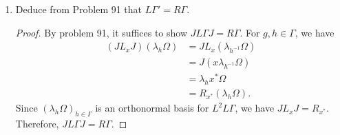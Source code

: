 \documentclass[a4paper,10pt]{report}
\DeclarePairedDelimiter{\set}{\{}{\}}
\begin{document}
\begin{enumerate}
\begin{enumerate}
\begin{proof}
					Now for all $g, h \in \Gamma$,
					\begin{align*}
						L_{\lambda_g}u\delta_h
						& = L_{\lambda_g}\lambda_h\Omega \\
						& = \lambda_g\lambda_h\Omega \\
						& = \lambda_{gh}\Omega \\
						& = u\delta_{gh} \\
						& = u\lambda_g\delta_h.
					\end{align*}
					Hence by linearity and continuity of $u$ and each $\lambda_g$, we have
					$L_xu\xi = ux\xi$ for all $\xi \in \ell^2\Gamma$ and all
					$x \in \text{span}\set{\lambda_g : g \in \Gamma}$.
					It remains to check that if $x_i \to x$ SOT, then $L_{x_i} \to L_x$ SOT.
					By the Kaplansky density theorem, we may assume $\|x_i\| \le \|x\|$ for all $i$.
					Then for $y \in L\Gamma$, we have $\|x_iy\| \le \|xy\|$ and $x_iy \to xy$ SOT.
					Hence, by the computation in the previous paragraph,
					$L_{x_i}(y\Omega) \to L_x(y\Omega)$ in $L^2L\Gamma$.
					Since this holds for all $y \in L\Gamma$, we have $L_{x_i} \to L_x$ SOT
					as desired.
				\end{proof}
			\item Deduce from Problem 91 that $L\Gamma' = R\Gamma$.
				\begin{proof}
					By problem 91, it suffices to show $J L\Gamma J = R\Gamma$.
					For $g, h \in \Gamma$, we have
					\begin{align*}
						(J L_x J) (\lambda_h\Omega)
						 & = J L_x (\lambda_{h^{-1}}\Omega) \\
						 & = J (x\lambda_{h^{-1}} \Omega) \\
						 & = \lambda_hx^* \Omega \\
						 & = R_{x^*}(\lambda_h \Omega).
					\end{align*}
					Since $(\lambda_h\Omega)_{h \in \Gamma}$ is an orthonormal basis for
					$L^2L\Gamma$, we have $JL_xJ = R_{x^*}$.
					Therefore, $J L\Gamma J = R\Gamma$.
				\end{proof}
		\end{enumerate}
\end{enumerate}
\end{document}
